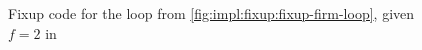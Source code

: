 \begin{figure}
	\begin{adjustbox}{max height=\textheight}
		
	\end{adjustbox}
	\caption{Fixup code for the loop from \cref{fig:impl:fixup:fixup-firm-loop}, given $f = 2$ in \libFIRM}\label{fig:impl:fixup:duff:fixup-firm}
\end{figure}